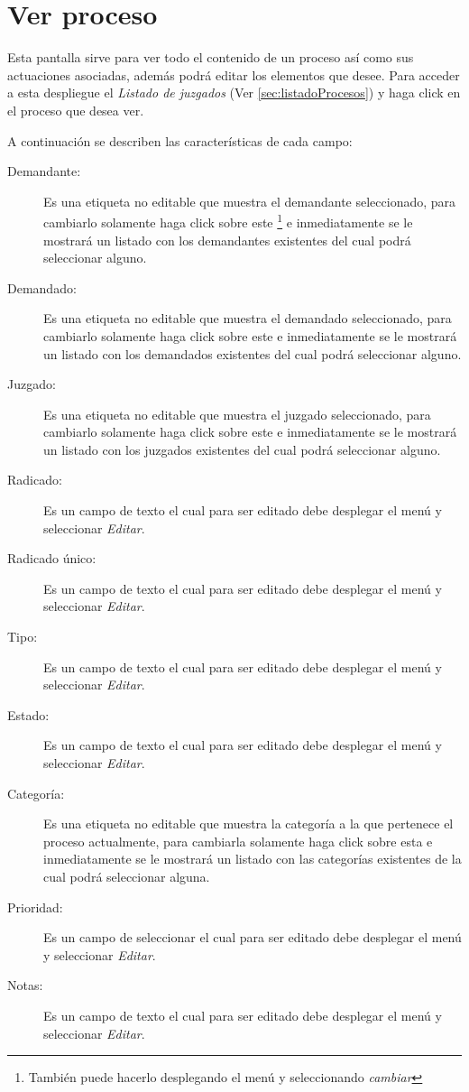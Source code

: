 \section{Ver proceso}
\label{sec:verProceso}
Esta pantalla sirve para ver todo el contenido de un proceso as\'i como sus
actuaciones asociadas, adem\'as podr\'a editar los elementos que desee. Para
acceder a esta despliegue el \emph{Listado de juzgados} (Ver
\ref{sec:listadoProcesos}) y haga click en el proceso que desea ver.

A continuaci\'on se describen las caracter\'isticas de cada campo:

\begin{description}
\item[Demandante:]Es una etiqueta no editable que muestra el demandante
seleccionado, para cambiarlo solamente haga click sobre este
\footnote{Tambi\'en puede hacerlo desplegando el men\'u \blackberry y
seleccionando \emph{cambiar}}
e inmediatamente se
le mostrar\'a un listado con los demandantes existentes del cual podr\'a
seleccionar alguno.
\item[Demandado:]Es una etiqueta no editable que muestra el demandado
seleccionado, para cambiarlo solamente haga click sobre este
\footnotemark[\value{footnote}]
e inmediatamente
se le mostrar\'a un listado con los demandados existentes del cual podr\'a
seleccionar alguno.
\item[Juzgado:]Es una etiqueta no editable que muestra el juzgado
seleccionado, para cambiarlo solamente haga click sobre este
\footnotemark[\value{footnote}]
e inmediatamente
se le mostrar\'a un listado con los juzgados existentes del cual podr\'a
seleccionar alguno.
\item[Radicado:]Es un campo de texto el cual para ser editado debe desplegar el
men\'u \blackberry y seleccionar \emph{Editar}.
\item[Radicado \'unico:]Es un campo de texto el cual para ser editado debe
desplegar el men\'u \blackberry y seleccionar \emph{Editar}.
\item[Tipo:]Es un campo de texto el cual para ser editado debe desplegar el
men\'u \blackberry y seleccionar \emph{Editar}.
\item[Estado:]Es un campo de texto el cual para ser editado debe desplegar el
men\'u \blackberry y seleccionar \emph{Editar}.
\item[Categor\'ia:]Es una etiqueta no editable que muestra la categor\'ia
a la que pertenece el proceso actualmente, para cambiarla solamente haga click
sobre esta
\footnotemark[\value{footnote}]
e inmediatamente se le mostrar\'a un listado con las categor\'ias existentes de
la cual podr\'a seleccionar alguna.
\item[Prioridad:]Es un campo de seleccionar el cual para ser editado debe desplegar
el men\'u \blackberry y seleccionar \emph{Editar}.
\item[Notas:]Es un campo de texto el cual para ser editado debe desplegar el
men\'u \blackberry y seleccionar \emph{Editar}.
\end{description}

